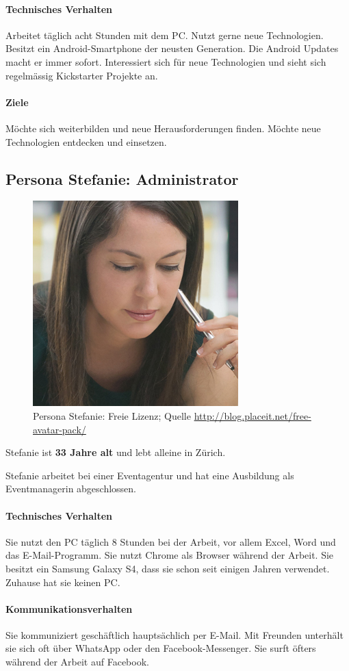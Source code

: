 \paragraph{Technisches Verhalten}
Arbeitet täglich acht Stunden mit dem PC. Nutzt gerne neue Technologien. Besitzt ein Android-Smartphone der neusten Generation. Die Android Updates macht er immer sofort. Interessiert sich für neue Technologien und sieht sich regelmässig Kickstarter Projekte an.
\paragraph{Ziele}
Möchte sich weiterbilden und neue Herausforderungen finden. Möchte neue Technologien entdecken und einsetzen.

\subsection{Persona Stefanie: Administrator}
\begin{figure}[h]
\centering
	\includegraphics[width=.35\textwidth]{images/persona-stefanie.jpg}
	\caption{Persona Stefanie: Freie Lizenz; Quelle
	 \protect\url{http://blog.placeit.net/free-avatar-pack/}}
	\label{fig:stefanie}
\end{figure}
Stefanie ist \textbf{33 Jahre alt} und lebt alleine in Zürich.

Stefanie arbeitet bei einer Eventagentur und hat eine Ausbildung als Eventmanagerin abgeschlossen.

\paragraph{Technisches Verhalten}
Sie nutzt den PC täglich 8 Stunden bei der Arbeit, vor allem Excel, Word und das E-Mail-Programm. Sie nutzt Chrome als Browser während der Arbeit. Sie besitzt ein Samsung Galaxy S4, dass sie schon seit einigen Jahren verwendet. Zuhause hat sie keinen PC.
\paragraph{Kommunikationsverhalten}
Sie kommuniziert geschäftlich hauptsächlich per E-Mail. Mit Freunden unterhält sie sich oft über WhatsApp oder den Facebook-Messenger. Sie surft öfters während der Arbeit auf Facebook.
